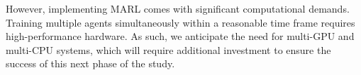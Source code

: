 However, implementing MARL comes with significant computational demands. Training multiple agents simultaneously within a reasonable time frame requires high-performance hardware. As such, we anticipate the need for multi-GPU and multi-CPU systems, which will require additional investment to ensure the success of this next phase of the study.
\appendix
